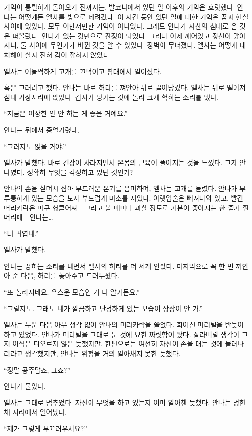 기억이 통렬하게 돌아오기 전까지는. 발코니에서 있던 일 이후의 기억은 흐릿했다. 안나는 어떻게든 엘사를 방으로 데려갔다. 이 시간 동안 있던 일에 대한 기억은 꿈과 현실 사이에 있었다. 모두 이만저만한 기억이 아니었다. 그래도 안나가 자신의 침대로 온 것은 떠올랐다. 안나가 있는 것만으로 진정이 되었다. 그러나 이제 깨어있고 정신이 맑아지니, 둘 사이에 무언가가 바뀐 것을 알 수 있었다. 장벽이 무너졌다. 엘사는 어떻게 대처해야 할지 전혀 감이 잡히지 않았다.

엘사는 어물쩍하게 고개를 끄덕이고 침대에서 일어섰다.

혹은 그러려고 했다. 안나는 바로 허리를 껴안아 뒤로 끌어당겼다. 엘사는 뒤로 떨어져 침대 가장자리에 앉았다. 갑자기 당기는 것에 놀라 크게 헉하는 소리를 냈다.

``지금은 이상한 일 안 하는 게 좋을 거예요.''

안나는 뒤에서 중얼거렸다.

``그러지도 않을 거야.''

엘사가 말했다. 바로 긴장이 사라지면서 온몸의 근육이 풀어지는 것을 느꼈다. 그저 안나였다. 정확히 무엇을 걱정하고 있던 것인가?

안나의 손을 살며시 잡아 부드러운 온기를 음미하며, 엘사는 고개를 돌렸다. 안나가 부루퉁하게 있는 모습을 보자 부드럽게 미소를 지었다. 아랫입술은 삐져나와 있고, 빨간 머리카락은 마구 헝클어져—그리고 볼 때마다 과할 정도로 기분이 좋아지는 한 줄기 흰 머리에—안나는\ldots

``너 귀엽네.''

엘사가 말했다.

안나는 끙하는 소리를 내면서 엘사의 허리를 더 세게 안았다. 마지막으로 꼭 한 번 껴안아 준 다음, 허리를 놓아주고 드러누웠다.

``또 놀리시네요. 우스운 모습인 거 다 알거든요.''

``그럴지도. 그래도 네가 깔끔하고 단정하게 있는 모습이 상상이 안 가.''

엘사는 누운 다음 아무 생각 없이 안나의 머리카락을 쓸었다. 희어진 머리털을 반듯이 하고 있었다. 안나가 머리털을 그대로 둔 것에 묘한 짜릿함이 왔다. 잘라버릴 생각이 그저 아직은 떠오르지 않은 듯했지만. 한편으로는 여전히 자신이 손을 대는 것에 물러나리라고 생각했지만, 안나는 위험을 거의 알아채지 못한 듯했다.

``정말 공주답죠, 그죠?''

안나가 물었다.

엘사는 그대로 멈추었다. 자신이 무엇을 하고 있는지 이미 알아챈 듯했다. 안나는 멍한 채 자리에서 일어났다.

``제가 그렇게 부끄러우세요?''

